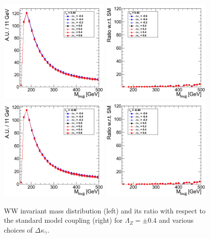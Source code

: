 \begin{figure}[h!t]
  {\centering
    \includegraphics[width=0.48\textwidth]{figs/Mass4Body_040.png}
    \includegraphics[width=0.48\textwidth]{figs/Mass4Body_040_ratio.png}
    \includegraphics[width=0.48\textwidth]{figs/Mass4Body_m040.png}
    \includegraphics[width=0.48\textwidth]{figs/Mass4Body_m040_ratio.png}
    \caption{WW invariant mass distribution (left) and its ratio with respect to 
    the standard model coupling (right) for $\Lambda_Z = \pm 0.4$ and various choices of $\Delta{\kappa_\gamma}$.}
    \label{fig:ww_Mass4Body_atgcRatio04}}
\end{figure}
